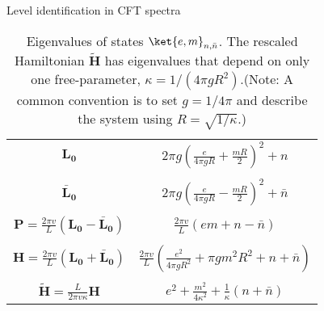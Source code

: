\newcommand{\uL}{\mathbf{L_0}}
\newcommand{\bL}{\mathbf{\bar{L}_0}}
\begin{frame}{Level identification in CFT spectra}
\vskip-1.5cm
\begin{table}[h]
\centering
\begin{tabular}{c|c}
$\uL$ & $2\pi g(\frac{e}{4 \pi g R} + \frac{m R}{2})^2 + n$  \\
& \\
$\bL$ & $2\pi g(\frac{e}{4 \pi g R} - \frac{m R}{2})^2 + \bar{n}$  \\
& \\
$\mathbf{P} =\frac{2\pi v}{L}(\uL-\bL)$ & $\frac{2\pi v}{L}(em + n - \bar{n})$ \\
& \\
$\mathbf{H} = \frac{2\pi v}{L}(\uL+\bL)$ & $\frac{2\pi v}{L}(\frac{e^2}{4 \pi g R^2} + \pi g m^2 R^2 + n + \bar{n})$ \\
& \\
$\tilde{\mathbf{H}} = \frac{L}{2 \pi v \kappa}\mathbf{H}$ & $e^2 + \frac{m^2}{4 \kappa^2} + \frac{1}{\kappa}(n + \bar{n})$       
\end{tabular}
\label{Table:EV}
\caption{Eigenvalues of states $\ket{e, m}_{n, \bar{n}}$. The rescaled Hamiltonian $\tilde{\mathbf{H}}$ has eigenvalues that depend on only one free-parameter, $\kappa = 1/(4 \pi g R^2)$.(Note: A common convention is to set $g=1/4\pi$ and describe the system using $R=\sqrt{1/\kappa}$.) }
\end{table}
\end{frame}

